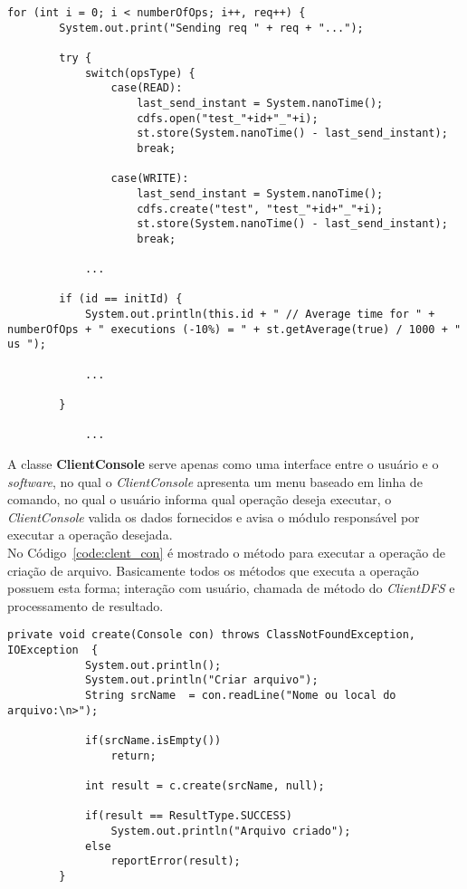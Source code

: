 \begin{lstlisting}[basicstyle=\ttfamily\footnotesize, frame=single, caption=Execução de teste na classe ClientTest, label=code:clent_test2]
	for (int i = 0; i < numberOfOps; i++, req++) {
		System.out.print("Sending req " + req + "...");
		
		try {
			switch(opsType) {
				case(READ):
					last_send_instant = System.nanoTime();
					cdfs.open("test_"+id+"_"+i);
					st.store(System.nanoTime() - last_send_instant);
					break;
				
				case(WRITE):
					last_send_instant = System.nanoTime();
					cdfs.create("test", "test_"+id+"_"+i);
					st.store(System.nanoTime() - last_send_instant);
					break;
				
			...
				
		if (id == initId) {
			System.out.println(this.id + " // Average time for " + numberOfOps + " executions (-10%) = " + st.getAverage(true) / 1000 + " us ");
			
			...
				
		}	
			
			...
\end{lstlisting}
 


A classe \textbf{ClientConsole} serve apenas como uma interface entre o usuário e o \textit{software}, no qual o \textit{ClientConsole} apresenta um menu baseado em linha de comando, no qual o usuário informa qual operação deseja executar, o \textit{ClientConsole} valida os dados fornecidos e avisa o módulo responsável por executar a operação desejada.
\\

No Código~\ref{code:clent_con} é mostrado o método para executar a operação de criação de arquivo.
Basicamente todos os métodos que executa a operação possuem esta forma; interação com usuário, chamada de método do \textit{ClientDFS} e processamento de resultado.
\begin{lstlisting}[basicstyle=\ttfamily\footnotesize, frame=single, caption=Exemplo de método da classe ClientConsole, label=code:clent_con]
		private void create(Console con) throws ClassNotFoundException, IOException  {
			System.out.println();
			System.out.println("Criar arquivo");
			String srcName  = con.readLine("Nome ou local do arquivo:\n>");
			
			if(srcName.isEmpty())
				return;
			
			int result = c.create(srcName, null);
			
			if(result == ResultType.SUCCESS)
				System.out.println("Arquivo criado");
			else
				reportError(result);
		}
\end{lstlisting}


